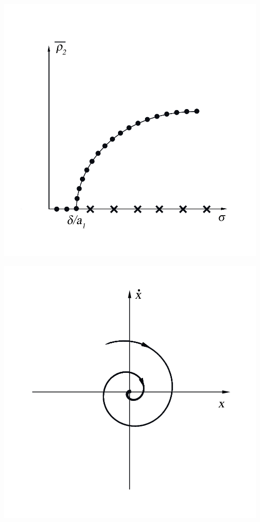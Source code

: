 \begin{center}
    \begin{minipage}{0.3\linewidth}
            \includegraphics[width=\linewidth]{photo/pics/Ris6.png}
            \label{fig:6}
    \end{minipage}
    \begin{minipage}[t]{0.6\linewidth}
            \begin{minipage}{0.45\linewidth}
                \includegraphics[width=\linewidth]{photo/pics/Ris7a.png}

\end{minipage}
\end{minipage}
\end{center}
